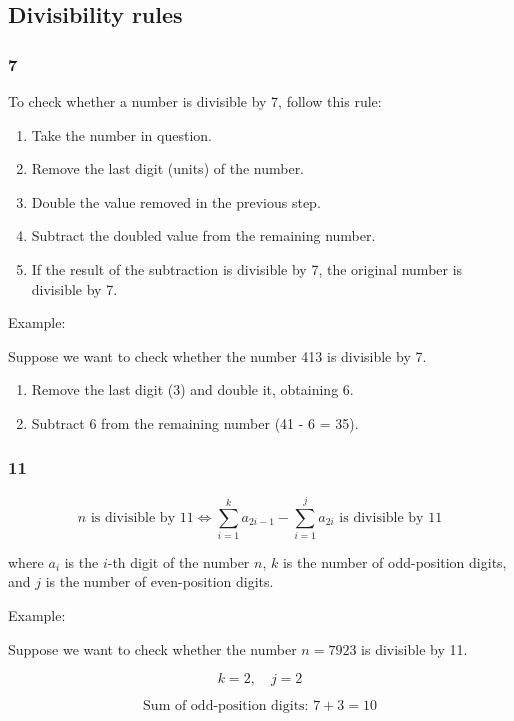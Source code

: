 \subsection{Divisibility rules}

\subsubsection{7}

To check whether a number is divisible by 7, follow this rule:

\begin{enumerate}
  \item Take the number in question.
  \item Remove the last digit (units) of the number.
  \item Double the value removed in the previous step.
  \item Subtract the doubled value from the remaining number.
  \item If the result of the subtraction is divisible by 7, the original number is divisible by 7.
\end{enumerate}

Example:

Suppose we want to check whether the number 413 is divisible by 7.

\begin{enumerate}
  \item Remove the last digit (3) and double it, obtaining 6.
  \item Subtract 6 from the remaining number (41 - 6 = 35).
\end{enumerate}

\subsubsection{11}

\[
n \text{ is divisible by 11} \iff \sum_{i=1}^{k} a_{2i-1} - \sum_{i=1}^{j} a_{2i} \text{ is divisible by 11}
\]

where \(a_{i}\) is the \(i\)-th digit of the number \(n\), \(k\) is the number of odd-position digits, and \(j\) is the number of even-position digits.

Example:

Suppose we want to check whether the number \(n = 7923\) is divisible by 11.

\[
k = 2, \quad j = 2
\]

\[
\text{Sum of odd-position digits: } 7 + 3 = 10
\]

